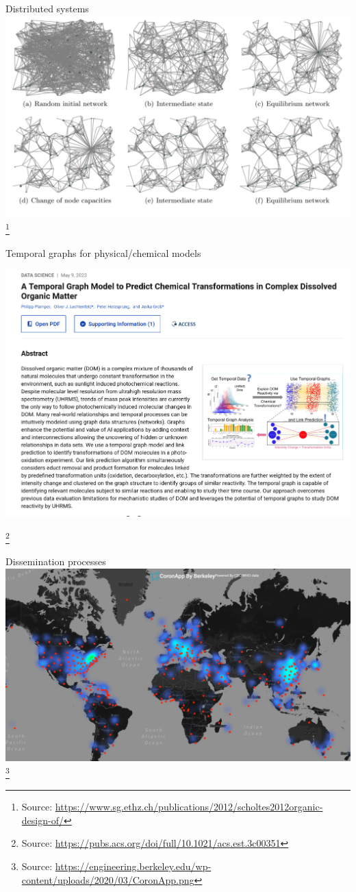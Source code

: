 \documentclass{beamer}
\newcommand{\sourcefootnote}[1]{\let\thefootnote\relax\footnote{{\tiny Source: \url{#1}}}}
\begin{document}
\begin{frame}{Distributed systems}
	\includegraphics[width=\linewidth]{media/massive_distributed_system.png}
	\sourcefootnote{https://www.sg.ethz.ch/publications/2012/scholtes2012organic-design-of/}
\end{frame}

\begin{frame}{Temporal graphs for physical/chemical models}
	\begin{center}
	\includegraphics[width=0.8\linewidth]{media/organic_chemistry.png}
	\end{center}
	\sourcefootnote{https://pubs.acs.org/doi/full/10.1021/acs.est.3c00351}
\end{frame}

\begin{frame}{Dissemination processes}
  \centering
  \includegraphics[width=\linewidth]{media/corona.png}
  \sourcefootnote{https://engineering.berkeley.edu/wp-content/uploads/2020/03/CoronApp.png}
\end{frame}
\end{document}
